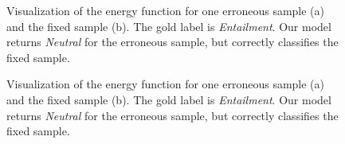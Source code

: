 \documentclass[11pt,a4paper]{article}
\begin{document}
	\begin{figure}[ht]
		\begin{center}
		\end{center}
		\caption{
			Visualization of the energy function for one erroneous sample (a) and the fixed sample (b). The gold label is \emph{Entailment}. Our model returns \emph{Neutral} for the erroneous sample, but correctly classifies the fixed sample.
		}
		\label{fig:att:miss5}
	\end{figure}
	
	\begin{figure}[ht]
		\begin{center}
		\end{center}
		\caption{
			Visualization of the energy function for one erroneous sample (a) and the fixed sample (b). The gold label is \emph{Entailment}. Our model returns \emph{Neutral} for the erroneous sample, but correctly classifies the fixed sample.
		}
		\label{fig:att:miss6}
	\end{figure}
	
\end{document}
